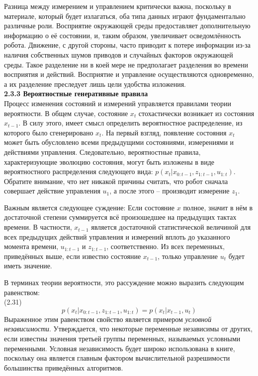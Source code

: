 \documentclass[10pt,a4paper]{article}
\begin{document}
 Разница между измерением и управлением критически важна, поскольку в материале, который будет излагаться, оба типа данных играют фундаментально различные роли. Восприятие окружающей среды предоставляет дополнительную информацию о её состоянии, и, таким образом, увеличивает осведомлённость робота. Движение, с другой стороны, часто приводит к потере информации из-за наличия собственных шумов приводов и случайных факторов окружающей среды. Такое разделение ни в коей мере не предполагает разделения во времени восприятия и действий. Восприятие и управление осуществляются одновременно, а их разделение преследует лишь цели удобства изложения.\\
 
 \textbf{ 2.3.3 Вероятностные генеративные правила}\\
 
 Процесс изменения состояний и измерений управляется правилами теории вероятности. В общем случае, состояние $x_t$ стохастически возникает из состояния $x_{t-1}$. В силу этого, имеет смысл определить вероятностное распределение, из которого было сгенерировано $x_t$.
 На первый взгляд, появление состояния $x_t$ может быть обусловлено всеми предыдущими состояниями, измерениями и действиями управления. Следовательно, вероятностные правила, характеризующие эволюцию состояния, могут быть изложены в виде вероятностного распределения следующего вида:
 $p(x_t | x_{0:t-1}, z_{1:t-1}, u_{1:t})$. Обратите внимание, что нет никакой причины считать, что робот сначала совершает действие управления $u_1$, а после этого – производит измерение $z_1$.
 
 Важным является следующее суждение: Если состояние $x$ полное, значит в нём в достаточной степени суммируется всё произошедшее на предыдущих тактах времени. В частности, $x_{t-1}$ является достаточной статистической величиной для всех предыдущих действий управления и измерений вплоть до указанного момента времени, 
 $u_{1:t-1}$ и $z_{1:t-1}$, соответственно. Из всех переменных, приведённых выше, если известно состояние $x_{t-1}$, только управление $u_t$ будет иметь значение.
 
 В терминах теории вероятности, это рассуждение можно выразить следующим равенством:\\
 
 (2.31) $$p(x_t | x_{0:t-1}, z_{1:t-1}, u_{1:t}) = p(x_t | x_{t-1}, u_t)$$
 Выраженное этим равенством свойство является примером \textit{условной независимости}. Утверждается, что некоторые переменные независимы от других, если известны значения третьей группы переменных, называемых условными переменными. Условная независимость будет широко использована в книге, поскольку она является главным фактором вычислительной разрешимости большинства приведённых алгоритмов.
  
\end{document}
